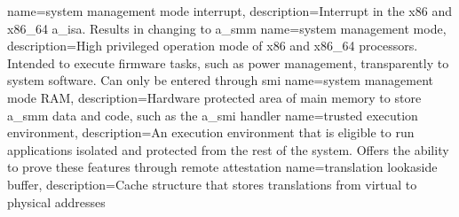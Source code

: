 {
    name=system management mode interrupt,
    description={Interrupt in the x86 and x86\_64 \acrshort{a_isa}. Results in changing to \acrshort{a_smm}}
}
{
    name=system management mode,
    description={High privileged operation mode of x86 and x86\_64 processors. Intended to execute firmware tasks, such
            as power management, transparently to system software. Can only be entered through \acrshort{smi}}
}
{
    name=system management mode RAM,
    description={Hardware protected area of main memory to store \acrshort{a_smm} data and code, such as the
            \acrshort{a_smi} handler}
}
%
{
    name=trusted execution environment,
    description={An execution environment that is eligible to run applications isolated and protected from the rest of
            the system. Offers the ability to prove these features through remote attestation}
}
{
    name=translation lookaside buffer,
    description={Cache structure that stores translations from virtual to physical addresses}
}
